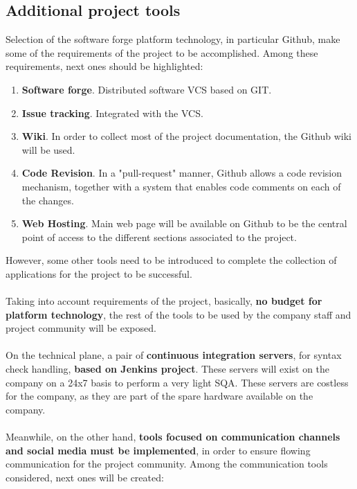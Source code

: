\documentclass[11pt]{article}
\begin{document}
\subsection{Additional project tools}
Selection of the software forge platform technology, in particular Github, make some of the requirements of the project to be accomplished. Among these requirements, next ones should be highlighted:
\begin{enumerate}\itemsep0pt
\item{\textbf{Software forge}}. Distributed software VCS based on GIT.
\item{\textbf{Issue tracking}}. Integrated with the VCS.
\item{\textbf{Wiki}}. In order to collect most of the project documentation, the Github wiki will be used.
\item{\textbf{Code Revision}}. In a "pull-request" manner, Github allows a code revision mechanism, together with a system that enables code comments on each of the changes.
\item{\textbf{Web Hosting}}. Main web page will be available on Github to be the central point of access to the different sections associated to the project.  
\end{enumerate}
However, some other tools need to be introduced to complete the collection of applications for the project to be successful.\\
\\
Taking into account requirements of the project, basically, \textbf{no budget for platform technology}, the rest of the tools to be used by the company staff and project community will be exposed.\\
\\
On the technical plane, a pair of \textbf{continuous integration servers}, for syntax check handling, \textbf{based on Jenkins project}. These servers will exist on the company on a 24x7 basis to perform a very light SQA. These servers are costless for the company, as they are part of the spare hardware available on the company.\\
\\
Meanwhile, on the other hand, \textbf{tools focused on communication channels and social media must be implemented}, in order to ensure flowing communication for the project community. Among the communication tools considered, next ones will be created:
\end{document}
